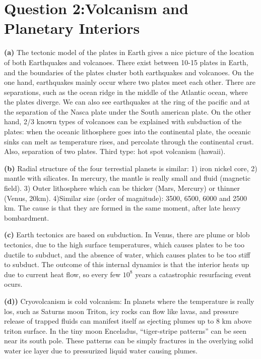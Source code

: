 \section{ Question 2:Volcanism and Planetary Interiors }\label{sec:q2}    

\textbf{(a)} The tectonic model of the plates in Earth gives a nice picture of the location of both Earthquakes and volcanoes. There exist between 10-15 plates in Earth, and the boundaries of the plates cluster both earthquakes and volcanoes. On the one hand, earthquakes mainly occur where two plates meet each other. There are separations, such as the ocean ridge in the middle of the Atlantic ocean, where the plates diverge. We can also see earthquakes at the ring of the pacific and at the separation of the Nasca plate under the South american plate. On the other hand, 2/3 known types of volcanoes can be explained with subduction of the plates: when the oceanic lithosphere goes into the continental plate, the oceanic sinks can melt as temperature rises, and percolate through the continental crust. Also, separation of two plates. Third type: hot spot volcanism (hawaii). 

\textbf{(b)} Radial structure of the four terrestial planets is similar: 1) iron nickel core, 2) mantle with silicates. In mercury, the mantle is really small and fluid (magnetic field). 3) Outer lithosphere which can be thicker (Mars, Mercury) or thinner (Venus, 20km). 4)Similar size (order of magnitude): 3500, 6500, 6000 and 2500 km. The cause is that they are formed in the same moment, after late heavy bombardment. 

\textbf{(c)} Earth tectonics are based on subduction. In Venus, there are plume or blob tectonics, due to the high surface temperatures, which causes plates to be too ductile to subduct, and the absence of water, which causes plates to be too stiff to subduct. The outcome of this internal dynamics is that the interior heats up due to current heat flow, so every few $10^8$ years a catastrophic resurfacing event ocurs.

\textbf{(d))} Cryovolcanism is cold volcanism: In planets where the temperature is really los, such as Saturns moon Triton, icy rocks can flow like lavas, and pressure release of trapped fluids can manifest itself as ejecting plumes up to 8 km above triton surface. In the tiny moon Enceladus, “tiger-stripe patterns” can be seen near its south pole. These patterns can be simply fractures in the overlying solid water ice layer due to pressurized liquid water causing plumes.